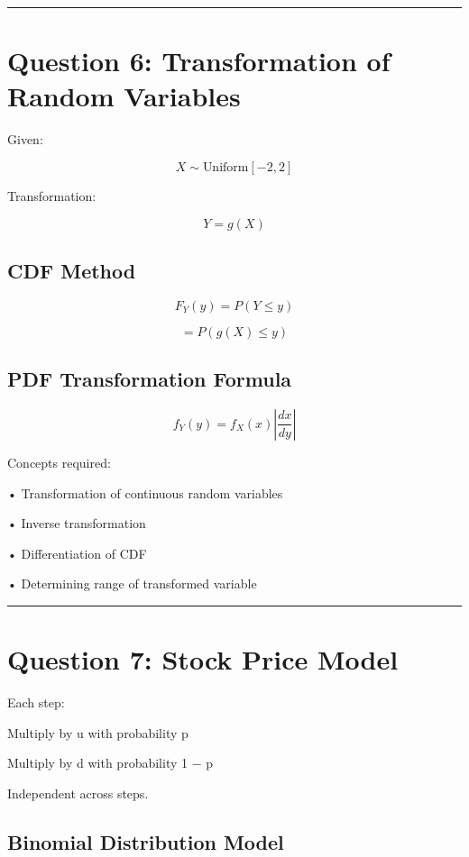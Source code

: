 \documentclass[12pt]{article}
\begin{document}
\vspace{0.5cm}
\hrule
\vspace{0.5cm}

\section*{Question 6: Transformation of Random Variables}

Given:

\[
X \sim \text{Uniform}[−2, 2]
\]

Transformation:

\[
Y = g(X)
\]

\subsection*{CDF Method}

\[
F_Y(y)
=
P(Y ≤ y)
\]

\[
=
P(g(X) ≤ y)
\]

\subsection*{PDF Transformation Formula}

\[
f_Y(y)
=
f_X(x)
\left| \frac{dx}{dy} \right|
\]

Concepts required:

• Transformation of continuous random variables

• Inverse transformation

• Differentiation of CDF

• Determining range of transformed variable

\vspace{0.5cm}
\hrule
\vspace{0.5cm}

\section*{Question 7: Stock Price Model}

Each step:

Multiply by u with probability p

Multiply by d with probability 1 − p

Independent across steps.

\subsection*{Binomial Distribution Model}
\end{document}
